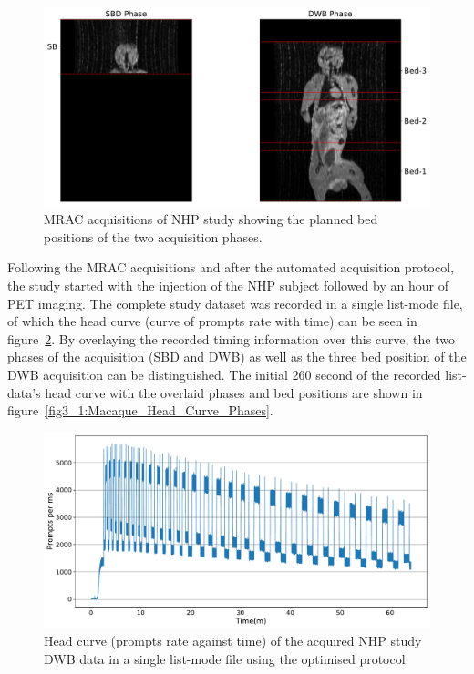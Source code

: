 \begin{figure} [ht!]
\centering
\includegraphics[scale=0.5,angle=0]{3_Results/3_1_DWB_Optimization/figures/3_1_Macaque_MRI.pdf}
\caption{MRAC acquisitions of NHP study showing the planned bed positions of the two acquisition phases.}
\label{fig3_1:Macaque_MRI}
\end{figure}

Following the MRAC acquisitions and after the automated acquisition protocol, the study started with the injection of the NHP subject followed by an hour of PET imaging. 
The complete study dataset was recorded in a single list-mode file, of which the head curve (curve of prompts rate with time) can be seen in figure~\ref{fig3_1:Macaque_Head_Curve}. By overlaying the recorded timing information over this curve, the two phases of the acquisition (SBD and DWB) as well as the three bed position of the DWB acquisition can be distinguished. The initial 260 second of the recorded list-data's head curve with the overlaid phases and bed positions are shown in figure~\ref{fig3_1:Macaque_Head_Curve_Phases}. 

\begin{figure} [ht!]
\centering
\includegraphics[scale=0.45,angle=0]{3_Results/3_1_DWB_Optimization/figures/3_1_Macaque_Head_Curve.pdf}
\caption{Head curve (prompts rate against time) of the acquired NHP study DWB data in a single list-mode file using the optimised protocol.}
\label{fig3_1:Macaque_Head_Curve}
\end{figure}

